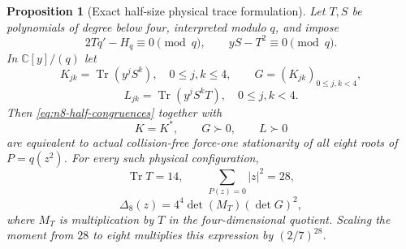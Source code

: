 \documentclass[11pt]{article}
\newtheorem{proposition}[theorem]{Proposition}
\theoremstyle{remark}
\newcommand{\C}{\mathbb C}
\numberwithin{equation}{section}
\begin{document}
\begin{proposition}[Exact half-size physical trace formulation]
\label{prop:n8-half-trace}
Let $T,S$ be polynomials of degree below four, interpreted modulo
$q$, and impose
\begin{equation}\label{eq:n8-half-congruences}
 2Tq'-H_q\equiv0\pmod q,\qquad yS-T^2\equiv0\pmod q.
\end{equation}
In $\C[y]/(q)$ let
\[
 K_{jk}=\operatorname{Tr}(y^jS^k),\quad 0\le j,k\le4,
 \qquad G=(K_{jk})_{0\le j,k<4},
\]
\[
 L_{jk}=\operatorname{Tr}(y^jS^kT),\quad 0\le j,k<4.
\]
Then \eqref{eq:n8-half-congruences} together with
\begin{equation}\label{eq:n8-half-positive}
                  K=K^*,\qquad G\succ0,\qquad L\succ0
\end{equation}
are equivalent to actual collision-free force-one stationarity of
all eight roots of $P=q(z^2)$.
For every such physical configuration,
\[
 \operatorname{Tr}T=14,\qquad \sum_{P(z)=0}|z|^2=28,
\]
\begin{equation}\label{eq:n8-half-objective}
 \Delta_8(z)=4^4\det(M_T)(\det G)^2,
\end{equation}
where $M_T$ is multiplication by $T$ in the four-dimensional quotient.
Scaling the moment from $28$ to eight multiplies this expression by
$(2/7)^{28}$.
\end{proposition}
\end{document}
